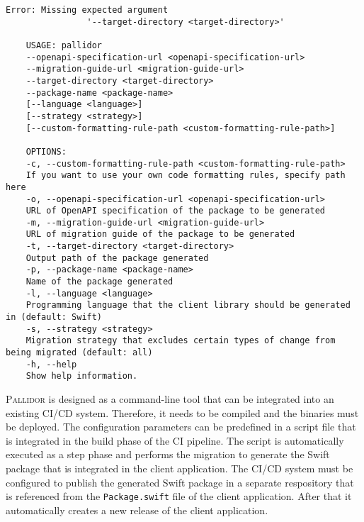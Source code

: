 \begin{lstlisting}[language=Tex, caption={Command-line arguments of Pallidor to support user}, captionpos=b, label={lst:arguments}]
	Error: Missing expected argument 
				'--target-directory <target-directory>'
	
	USAGE: pallidor 
	--openapi-specification-url <openapi-specification-url> 
	--migration-guide-url <migration-guide-url>
	--target-directory <target-directory> 
	--package-name <package-name> 
	[--language <language>] 
	[--strategy <strategy>]
	[--custom-formatting-rule-path <custom-formatting-rule-path>]
	
	OPTIONS:
	-c, --custom-formatting-rule-path <custom-formatting-rule-path>
	If you want to use your own code formatting rules, specify path here 
	-o, --openapi-specification-url <openapi-specification-url>
	URL of OpenAPI specification of the package to be generated 
	-m, --migration-guide-url <migration-guide-url>
	URL of migration guide of the package to be generated 
	-t, --target-directory <target-directory>
	Output path of the package generated 
	-p, --package-name <package-name>
	Name of the package generated 
	-l, --language <language>
	Programming language that the client library should be generated in (default: Swift)
	-s, --strategy <strategy>
	Migration strategy that excludes certain types of change from being migrated (default: all)
	-h, --help
	Show help information.

\end{lstlisting}

\textsc{Pallidor} is designed as a command-line tool that can be integrated into an existing CI/CD system. Therefore, it needs to be compiled and the binaries must be deployed. The configuration parameters can be predefined in a script file that is integrated in the build phase of the CI pipeline. The script is automatically executed as a step phase and performs the migration to generate the Swift package that is integrated in the client application. The CI/CD system must be configured to publish the generated Swift package in a separate respository that is referenced from the \texttt{Package.swift} file of the client application. After that it automatically creates a new release of the client application.